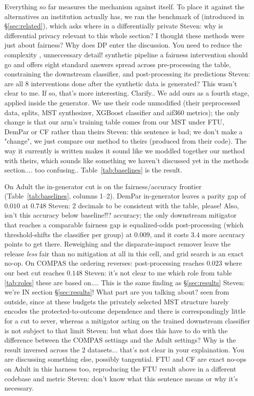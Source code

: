 \documentclass{article}
\newcommand{\s}[1]{\textcolor{Dandelion}{Steven: #1}}
\begin{document}


Everything so far measures the mechanism against itself. To place it against
the alternatives an institution actually has, we ran the benchmark of
\citet{angelozzi2026where} (introduced in \S\ref{sec:related}), which asks
where in a differentially private \s{why is differential privacy relevant to this whole section? I thought these methods were just about fairness? Why does DP enter the discussion. You need to reduce the complexity , unneccessary detail!} synthetic pipeline a fairness intervention
should go and offers eight standard answers spread across pre-processing the
table, constraining the downstream classifier, and post-processing its predictions \s{are all 8 interventions done after the synthetic data is generated? This wasn't clear to me. If so, that's more interesting. Clarify.}. We
add ours as a fourth stage, applied inside the generator. We use their code
unmodified (their preprocessed data, splits, MST synthesizer, XGBoost
classifier and aif360 metrics); the only change is that our arm's training
table comes from our MST under FTU, DemPar or CF rather than theirs \s{this sentence is bad; we don't make a "change", we just compare our method to theirs (produced from their code). The way it currently is written makes it sound like we moddled together our method with theirs, which sounds like something we haven't discussed yet in the methods section.... too confusing.}.
Table~\ref{tab:baselines} is the result.

On Adult the in-generator cut is on the fairness/accuracy frontier
(Table~\ref{tab:baselines}, columns 1--2). DemPar in-generator leaves a
parity gap of $0.010$ at $0.748$ \s{2 decimals to be consistent with the table, please! Also, isn't this accuracy below baseline!!?} accuracy; the only downstream mitigator that
reaches a comparable fairness gap is equalized-odds post-processing (which threshold-shifts the classifier per group) at $0.009$, and it costs $3.4$ more accuracy
points to get there. Reweighing and the disparate-impact remover leave the
release \emph{less} fair than no mitigation at all in this cell, and grid
search is an exact no-op. On COMPAS the ordering reverses: post-processing
reaches $0.023$ where our best cut reaches $0.148$ \s{it's not clear to me which role from table \ref{tab:roles} these are based on...}. This is the same finding
as \S\ref{sec:results} \s{we're IN section \S\ref{sec:results}! What part are you talking about?} seen from outside, since at these budgets the
privately selected MST structure barely encodes the protected-to-outcome
dependence and there is correspondingly little for a cut to sever, whereas a
mitigator acting on the trained downstream classifier is not subject to that limit \s{but what does this have to do with the difference between the COMPAS settings and the Adult settings? Why is the result inversed across the 2 datasets... that's not clear in your explaination. You are discussing something else, possibly tangential}. FTU and
CF are exact no-ops on Adult in this harness too, reproducing the FTU result
above in a different codebase and metric \s{don't know what this sentence means or why it's necessary}.
\end{document}
